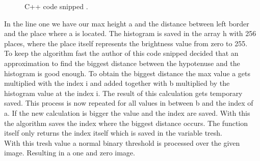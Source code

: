 \lstset{style=mystyle}
\begin{figure}[ht]
	\centering
	
	\caption{C++ code snipped \cite{cv_code}.}
	\label{theory:code}
\end{figure}
In the line one we have our max height a and the distance between left border and the place where a is located. The histogram is saved in the array h with 256 places, where the place itself represents the brightness value from zero to 255.\\
To keep the algorithm fast the author of this code snipped decided that an approximation to find the biggest distance between the hypotenuse and the histogram is good enough. To obtain the biggest distance the max value a gets multiplied with the index i and added together with b multiplied by the histogram value at the index i. The result of this calculation gets temporary saved. This process is now repeated for all values in between b and the index of a. If the new calculation is bigger the value and the index are saved. With this the algorithm saves the index where the biggest distance occurs. The function itself only returns the index itself which is saved in the variable tresh. \\
With this tresh value a normal binary threshold is processed over the given image. Resulting in a one and zero image.   
\newpage